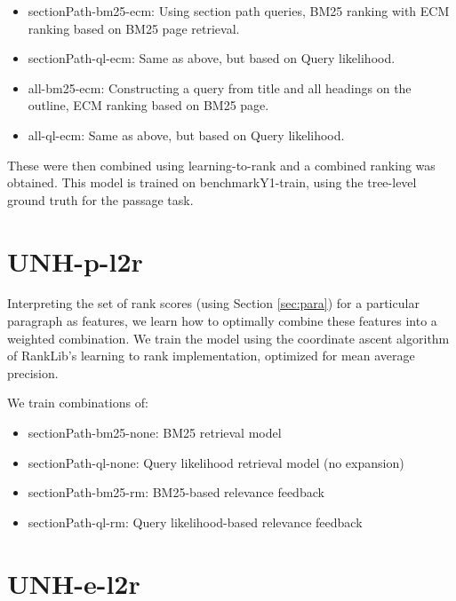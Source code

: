 \documentclass{article}
\begin{document}
\begin{itemize}
\item sectionPath-bm25-ecm: Using section path queries, BM25 ranking with ECM ranking based on BM25 page retrieval.
\item sectionPath-ql-ecm: Same as above, but based on Query likelihood.
\item all-bm25-ecm: Constructing a query from title and all headings on the outline,  ECM ranking based on BM25 page.
\item all-ql-ecm: Same as above, but based on Query likelihood.

    \end{itemize}

These were then combined using  learning-to-rank and a combined ranking was obtained. 
This model is trained on benchmarkY1-train, using the tree-level ground truth for the passage task.    

\section{UNH-p-l2r}

Interpreting the set of rank scores (using Section \ref{sec:para}) for a particular paragraph as features, we learn how to optimally combine these features into a weighted combination. We train the model using the coordinate ascent algorithm of RankLib's learning to rank implementation, optimized for mean average precision. 

We train combinations of:
\begin{itemize}
    \item sectionPath-bm25-none: BM25 retrieval model
    \item sectionPath-ql-none: Query likelihood retrieval model (no expansion)
    \item sectionPath-bm25-rm: BM25-based relevance feedback
    \item sectionPath-ql-rm: Query likelihood-based relevance feedback
\end{itemize}

\section{UNH-e-l2r}
\end{document}

